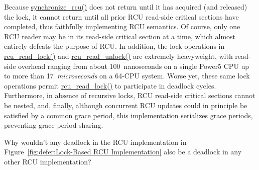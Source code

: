 Because \url{synchronize_rcu()} does not return until it has acquired
(and released) the lock, it cannot return until all prior RCU read-side
critical sections have completed, thus faithfully implementing
RCU semantics.
Of course, only one RCU reader may be in its read-side critical section
at a time, which almost entirely defeats the purpose of RCU.
In addition, the lock operations in \url{rcu_read_lock()} and
\url{rcu_read_unlock()} are extremely heavyweight,
with read-side overhead ranging from about 100~nanoseconds on a single Power5
CPU up to more than 17~\emph{microseconds} on a 64-CPU system.
Worse yet,
these same lock operations permit \url{rcu_read_lock()}
to participate in deadlock cycles.
Furthermore, in absence of recursive locks,
RCU read-side critical sections cannot be nested, and, finally,
although concurrent RCU updates could in principle be satisfied by
a common grace period, this implementation serializes grace periods,
preventing grace-period sharing.

\QuickQuiz{}
	Why wouldn't any deadlock in the RCU implementation in
	Figure~\ref{fig:defer:Lock-Based RCU Implementation}
	also be a deadlock in any other RCU implementation?
 \QuickQuizEnd

